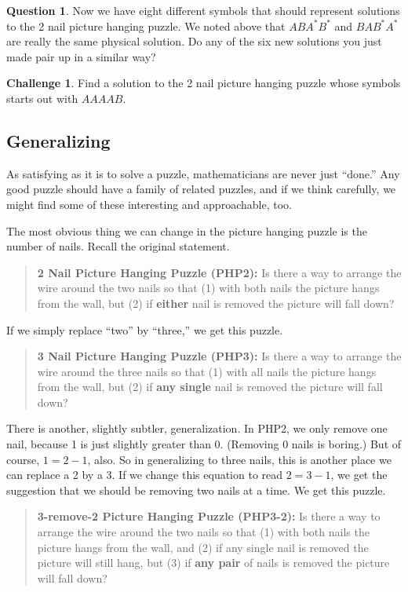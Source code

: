 \documentclass[12pt,letterpaper]{article}
\theoremstyle{definition}
\newtheorem{question}{Question}
\newtheorem*{challenge}{Challenge}
\begin{document}
\begin{question}
Now we have eight different symbols that should represent solutions to the 2 nail picture hanging puzzle. 
We noted above that $ABA^*B^*$ and $BAB^*A^*$ are really the same physical solution. 
Do any of the six new solutions you just made pair up in a similar way?
\end{question}

\begin{challenge}
Find a solution to the 2 nail picture hanging puzzle whose symbols starts out with $AAAAB$.
\end{challenge}

\subsection*{Generalizing}

As satisfying as it is to solve a puzzle, mathematicians are never just ``done.''
Any good puzzle should have a family of related puzzles, and if we think carefully, we might find some of these interesting and approachable, too.

The most obvious thing we can change in the picture hanging puzzle is the number of nails.
Recall the original statement.
\begin{quotation}
\noindent
\textbf{2 Nail Picture Hanging Puzzle (PHP2):} Is there a way to arrange the wire around the two nails so that (1) with both nails the picture hangs from the wall, but (2) if \textbf{either} nail is removed the picture will fall down?
\end{quotation} 

If we simply replace ``two'' by ``three,'' we get this puzzle.
\begin{quotation}
\noindent
\textbf{3 Nail Picture Hanging Puzzle (PHP3):} Is there a way to arrange the wire around the three nails so that (1) with all nails the picture hangs from the wall, but (2) if \textbf{any single} nail is removed the picture will fall down?
\end{quotation} 

There is another, slightly subtler, generalization.
In PHP2, we only remove one nail, because 1 is just slightly greater than 0.
(Removing 0 nails is boring.)
But of course, $1=2-1$, also.
So in generalizing to three nails, this is another place we can replace a 2 by a 3.
If we change this equation to read $2 = 3 -1$, we get the suggestion that we should be removing two nails at a time.
We get this puzzle.
\begin{quotation}
\noindent
\textbf{3-remove-2 Picture Hanging Puzzle (PHP3-2):} Is there a way to arrange the wire around the two nails so that (1) with both nails the picture hangs from the wall, and (2) if any single nail is removed the picture will still hang, but (3) if \textbf{any pair} of nails is removed the picture will fall down?
\end{quotation} 
\end{document}
